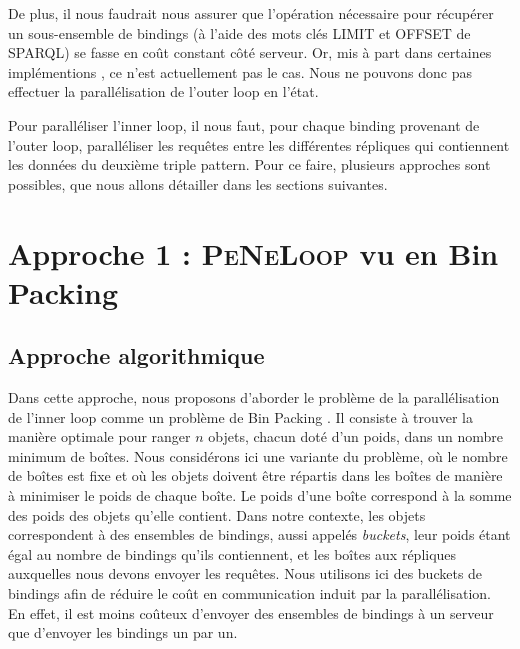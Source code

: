 \documentclass[a4paper]{article}
\def\sparql{\textsc{SPARQL}\xspace}
\def\peneloop{\textsc{PeNeLoop}\xspace}
\begin{document}
De plus, il nous faudrait nous assurer que l'opération nécessaire pour récupérer un sous-ensemble de bindings (à l'aide des mots clés \textsc{LIMIT} et \textsc{OFFSET} de \sparql) se fasse en coût constant côté serveur. Or, mis à part dans certaines implémentions \cite{gimenez2015hdt}, ce n'est actuellement pas le cas. Nous ne pouvons donc pas effectuer la parallélisation de l'outer loop en l'état.

Pour paralléliser l'inner loop, il nous faut, pour chaque binding provenant de l'outer loop, paralléliser les requêtes entre les différentes répliques qui contiennent les données du deuxième triple pattern. Pour ce faire, plusieurs approches sont possibles, que nous allons détailler dans les sections suivantes.

\section{Approche 1 : \peneloop vu en Bin Packing}

\subsection{Approche algorithmique}

Dans cette approche, nous proposons d'aborder le problème de la parallélisation de l'inner loop comme un problème de Bin Packing \cite{kantorovich1960mathematical}. Il consiste à trouver la manière optimale pour ranger $n$ objets, chacun doté d'un poids, dans un nombre minimum de boîtes. Nous considérons ici une variante du problème, où le nombre de boîtes est fixe et où les objets doivent être répartis dans les boîtes de manière à minimiser le poids de chaque boîte. Le poids d'une boîte correspond à la somme des poids des objets qu'elle contient. Dans notre contexte, les objets correspondent à des ensembles de bindings, aussi appelés \textit{buckets}, leur poids étant égal au nombre de bindings qu'ils contiennent, et les boîtes aux répliques auxquelles nous devons envoyer les requêtes. Nous utilisons ici des buckets de bindings afin de réduire le coût en communication induit par la parallélisation. En effet, il est moins coûteux d'envoyer des ensembles de bindings à un serveur que d'envoyer les bindings un par un.
\end{document}
